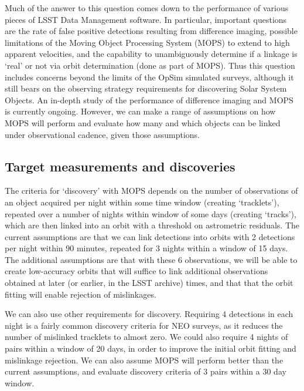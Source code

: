 Much of the answer to this question comes down to the performance of
various pieces of LSST Data Management software. In particular,
important questions are the
rate of false positive detections resulting from difference imaging, possible
limitations of the Moving Object Processing System (MOPS) to extend to high
apparent velocities, and the capability to unambiguously determine if
a linkage is `real' or not via orbit determination (done as part of
MOPS). Thus this question includes concerns beyond the limits of the OpSim simulated
surveys, although it still bears on the observing strategy requirements for
discovering Solar System Objects. An in-depth study of the performance
of difference imaging and MOPS is currently ongoing. However, we can
make a range of assumptions on how MOPS will perform and evaluate how
many and which objects can be linked under observational cadence, given those assumptions.



\subsection{Target measurements and discoveries}
\label{sec:\secname:targets}

The criteria for `discovery' with MOPS depends on the number
of observations of an object acquired per night within some time
window (creating `tracklets'), repeated over a number of nights within window of some
days (creating `tracks'), which are then linked into an orbit with a threshold on
astrometric residuals. The current assumptions are that we can link
detections into orbits with 2 detections per night within 90 minutes,
repeated for 3 nights within a window of 15 days. The additional assumptions are
that with these 6 observations, we will be able to create low-accuracy orbits that will suffice to link
additional observations obtained at later (or earlier, in the LSST
archive) times, and that that the orbit fitting will enable rejection
of mislinkages.

We can also use other requirements for discovery. Requiring 4
detections in each night is a fairly common discovery criteria for
NEO surveys, as it reduces the number of mislinked tracklets to almost
zero. We could also require 4 nights of pairs within a window of 20 days, in order to improve the
initial orbit fitting and mislinkage rejection. We can also assume
MOPS will perform better than the current assumptions, and evaluate
discovery criteria of 3 pairs within a 30 day window.

